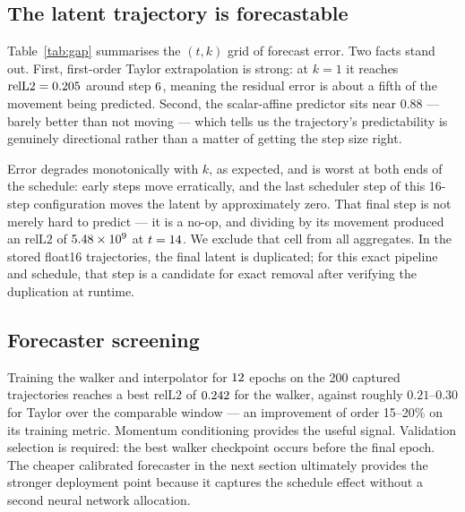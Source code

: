 \documentclass[11pt,a4paper]{article}
\newcommand{\relltwo}{\ensuremath{\mathrm{relL2}}}
\begin{document}
\subsection{The latent trajectory is forecastable}
\label{sec:gap}

Table~\ref{tab:gap} summarises the $(t,k)$ grid of forecast error. Two facts
stand out. First, first-order Taylor extrapolation is strong: at $k=1$ it
reaches $\relltwo = \BestTaylorRelLTwo$ around step $6$, meaning
the residual error is about a fifth of the movement being predicted. Second, the
scalar-affine predictor sits near $0.88$ --- barely better than not moving --- which
tells us the trajectory's predictability is genuinely directional rather than a
matter of getting the step size right.

\begin{table}[ht]
\centering

\caption{Trajectory predictability by draft length. \relltwo{} is error over
actual movement; $1.0$ is the no-movement baseline. Lower is better. The
degenerate final-step cell is excluded (see text).}
\label{tab:gap}
\end{table}

Error degrades monotonically with $k$, as expected, and is worst at both ends of
the schedule: early steps move erratically, and the last scheduler step of this
16-step configuration moves the latent by approximately zero. That final step is
not merely hard to predict --- it is a no-op, and dividing by its movement
produced an \relltwo{} of $5.48 \times 10^{9}$ at $t=14$. We exclude
that cell from all aggregates. In the stored float16 trajectories, the final
latent is duplicated; for this exact pipeline and schedule, that step is a
candidate for exact removal after verifying the duplication at runtime.

\subsection{Forecaster screening}

Training the walker and interpolator for $12$ epochs on the 200
captured trajectories reaches a best \relltwo{} of $0.242$ for the walker,
against roughly $0.21$--$0.30$ for Taylor over the comparable window --- an
improvement of order 15--20\% on its training metric. Momentum conditioning
provides the useful signal. Validation selection is required: the best walker
checkpoint occurs before the final epoch. The cheaper calibrated forecaster in
the next section ultimately provides the stronger deployment point because it
captures the schedule effect without a second neural network allocation.
\end{document}
